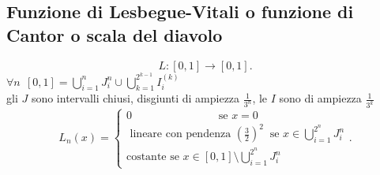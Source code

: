 \documentclass[12px]{article}
\begin{document}
	\subsection{Funzione di Lesbegue-Vitali o funzione di Cantor o scala del diavolo}
	\[
		L:[0,1] \rightarrow [0,1]
	.\]
	$\forall n \ \ [0,1] = \bigcup^{n}_{i = 1}J^n_i\cup \bigcup^{2^{k-1}}_{k = 1}I^{(k)}_i$ \\
	gli $J$ sono intervalli chiusi, disgiunti di ampiezza $\frac 1 {3^n}$, le $I$ sono di ampiezza $\frac 1 {3^k}$\\
	 \[
	L_n(x) = \begin{cases}
		0 \ \ \ \ \ \ \ \ \ \ \ \ \ \ \ \ \ \ \ \ \ \ \ \ \ \ \ \ \ \ \ \ \ \ \text { se } x = 0\\
		\text{ lineare con pendenza } (\frac 32)^2 \ \text { se  } x\in \bigcup^{2^n}_{i = 1}J_i^n \\
		\text {costante  \ \ \ \ \ \ \ \ \ \ \  \ \ \  \ \  \ \ \ \ \ \ \ \ \    se }  x\in [0,1]\setminus \bigcup^{2^n}_{i = 1}J_i^n
	\end{cases}
	.\] 
\end{document}
